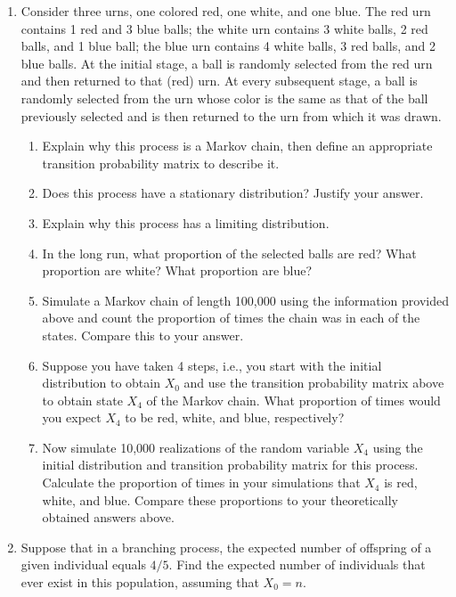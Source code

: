 \documentclass{article}
\begin{document}
\begin{enumerate}
\begin{enumerate}
  \end{enumerate}

  \item Consider three urns, one colored red, one white, and one blue.
  The red urn contains 1 red and 3 blue balls; the white urn contains
  3 white balls, 2 red balls, and 1 blue ball; the blue urn contains
  4 white balls, 3 red balls, and 2 blue balls.  At the initial stage,
  a ball is randomly selected from the red urn and then returned to
  that (red) urn. At every subsequent stage, a ball is randomly selected
  from the urn whose color is the same as that of the ball previously
  selected and is then returned to the urn from which it was drawn. 

  \begin{enumerate}

    \item Explain why this process is a Markov chain, then define an appropriate
    transition probability matrix to describe it.

    \item Does this process have a stationary distribution? Justify your answer.

    \item Explain why this process has a limiting distribution.

    \item In the long run, what proportion of the selected balls are red? What
    proportion are white? What proportion are blue?

    \item Simulate a Markov chain of length 100,000 using the information
    provided above and count the proportion of times the chain was in each of
    the states. Compare this to your answer.

    \item Suppose you have taken 4 steps, i.e., you start with the initial
    distribution to obtain $X_0$ and use the transition probability matrix above
    to obtain state $X_4$ of the Markov chain. What proportion of times would
    you expect $X_4$ to be red, white, and blue, respectively?
 
    \item Now simulate 10,000 realizations of the random variable $X_4$ using
    the initial distribution and transition probability matrix for this process.
    Calculate the proportion of times in your simulations that $X_4$ is red,
    white, and blue. Compare these proportions to your theoretically obtained
    answers above.

  \end{enumerate} 

  \item Suppose that in a branching process, the expected number of offspring of
  a given individual equals $4/5$. Find the expected number of individuals that
  ever exist in this population, assuming that $X_0=n$.

\end{enumerate}
\end{document}
